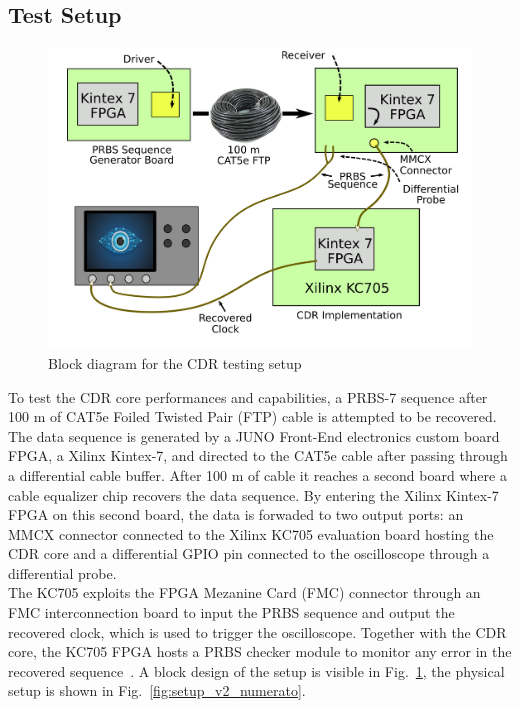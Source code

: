 \documentclass[11pt]{article}
\renewcommand{\>}{\rangle} \renewcommand{\emptyset}{\varnothing}
\begin{document}
\subsection{Test Setup}
\begin{figure}
  \begin{center}
    \includegraphics[width=0.9\linewidth]{images/block_setup}
    \caption{Block diagram for the CDR testing setup}
    \label{fig:block_setup}
  \end{center}
\end{figure}
To test the CDR core performances and capabilities, a PRBS-7 sequence after 100
m of CAT5e Foiled Twisted Pair (FTP) cable is attempted to be recovered. The
data sequence is generated by a JUNO Front-End electronics custom board FPGA, a
Xilinx Kintex-7, and directed to the CAT5e cable after passing through a
differential cable buffer. After 100 m of cable it reaches a second board where
a cable equalizer chip recovers the data sequence. By entering the Xilinx
Kintex-7 FPGA on this second board, the data is forwaded to two output ports: an
MMCX connector connected to the Xilinx KC705 evaluation board hosting the CDR
core and a differential GPIO pin connected to the oscilloscope through a
differential probe. \\
The KC705 exploits the FPGA Mezanine Card (FMC) connector through an FMC
interconnection board to input the PRBS sequence and output the recovered clock,
which is used to trigger the oscilloscope. Together with the CDR core, the KC705
FPGA hosts a PRBS checker module to monitor any error in the recovered
sequence~\cite{ref:prbs}. A block design of the setup is visible in
Fig.~\ref{fig:block_setup}, the physical setup is shown in
Fig.~\ref{fig:setup_v2_numerato}.
\end{document}
